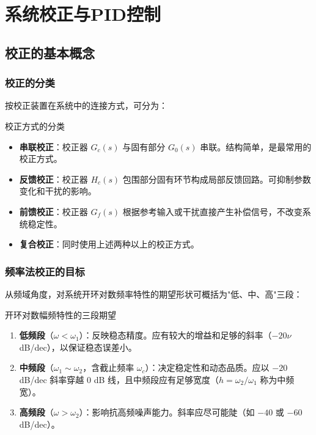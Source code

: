 
\chapter{系统校正与PID控制}


\section{校正的基本概念}

\subsection{校正的分类}

按校正装置在系统中的连接方式，可分为：

\begin{mydefinition}{校正方式的分类}
\begin{itemize}
    \item \textbf{串联校正}：校正器 $G_c(s)$ 与固有部分 $G_0(s)$ 串联。结构简单，是最常用的校正方式。
    \item \textbf{反馈校正}：校正器 $H_c(s)$ 包围部分固有环节构成局部反馈回路。可抑制参数变化和干扰的影响。
    \item \textbf{前馈校正}：校正器 $G_f(s)$ 根据参考输入或干扰直接产生补偿信号，不改变系统稳定性。
    \item \textbf{复合校正}：同时使用上述两种以上的校正方式。
\end{itemize}
\end{mydefinition}

\subsection{频率法校正的目标}

从频域角度，对系统开环对数频率特性的期望形状可概括为"低、中、高"三段：

\begin{mydefinition}{开环对数幅频特性的三段期望}
\begin{enumerate}
    \item \textbf{低频段}（$\omega < \omega_1$）：反映稳态精度。应有较大的增益和足够的斜率（$-20\nu$ dB/dec），以保证稳态误差小。
    \item \textbf{中频段}（$\omega_1 \sim \omega_2$，含截止频率 $\omega_c$）：决定稳定性和动态品质。应以 $-20$ dB/dec 斜率穿越 0 dB 线，且中频段应有足够宽度（$h = \omega_2/\omega_1$ 称为中频宽）。
    \item \textbf{高频段}（$\omega > \omega_2$）：影响抗高频噪声能力。斜率应尽可能陡（如 $-40$ 或 $-60$ dB/dec）。
\end{enumerate}
\end{mydefinition}

